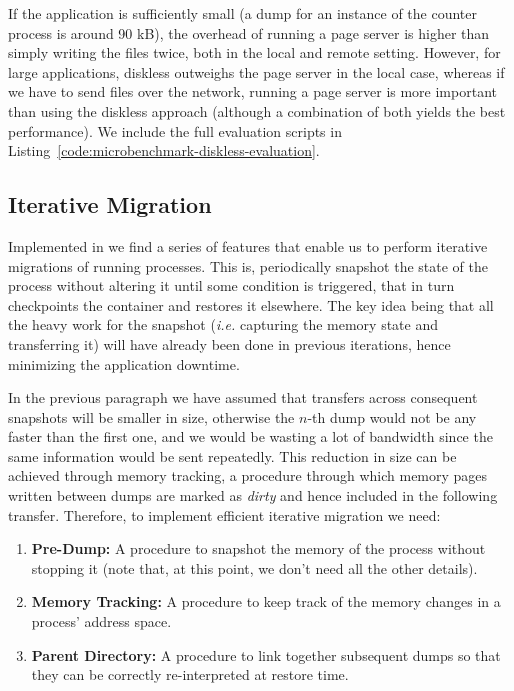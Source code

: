 If the application is sufficiently small (a dump for an instance of the counter process is around 90 kB), the overhead of running a page server is higher than simply writing the files twice, both in the local and remote setting.
However, for large applications, diskless outweighs the page server in the local case, whereas if we have to send files over the network, running a page server is more important than using the diskless approach (although a combination of both yields the best performance).
We include the full evaluation scripts in Listing~\ref{code:microbenchmark-diskless-evaluation}.

\subsection{Iterative Migration}


Implemented in \criu we find a series of features that enable us to perform iterative migrations of running processes.
This is, periodically snapshot the state of the process without altering it until some condition is triggered, that in turn checkpoints the container and restores it elsewhere.
The key idea being that all the heavy work for the snapshot (\textit{i.e.} capturing the memory state and transferring it) will have already been done in previous iterations, hence minimizing the application downtime.

In the previous paragraph we have assumed that transfers across consequent snapshots will be smaller in size, otherwise the $n$-th dump would not be any faster than the first one, and we would be wasting a lot of bandwidth since the same information would be sent repeatedly.
This reduction in size can be achieved through memory tracking, a procedure through which memory pages written between dumps are marked as \emph{dirty} and hence included in the following transfer.
Therefore, to implement efficient iterative migration we need:
\begin{enumerate}
    \item \textbf{Pre-Dump:} A procedure to snapshot the memory of the process without stopping it (note that, at this point, we don't need all the other details).
    \item \textbf{Memory Tracking:} A procedure to keep track of the memory changes in a process' address space.
    \item \textbf{Parent Directory:} A procedure to link together subsequent dumps so that they can be correctly re-interpreted at restore time.
\end{enumerate}

